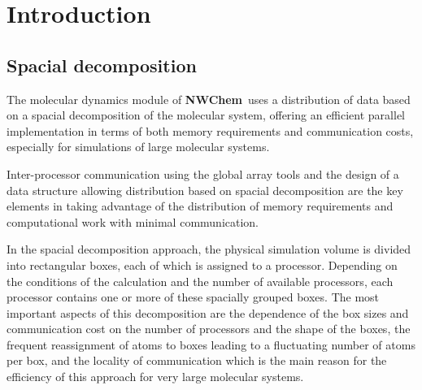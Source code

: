 \label{sec:nwARGOS}
\newcommand{\mc}[3]{\mbox{\bf #3}}
\newcommand{\vb}[1]{\mbox{\verb.#1.}}
\newcommand{\none}{\multicolumn{2}{|c|}{ }}
\newcommand{\mcc}[1]{\multicolumn{2}{c}{#1}}
\def\bmu{\mbox{\boldmath $\mu$}}
\def\bE{\mbox{\bf E}}
\def\br{\mbox{\bf r}}
\def\tT{\tilde{T}}
\def\t{\tilde{1}}
\def\ip{i\prime}
\def\jp{j\prime}
\def\ipp{i\prime\prime}
\def\jpp{j\prime\prime}
\def\etal{{\sl et al.}}
\def\nwchem{{\bf NWChem}}
\def\nwargos{{\bf nwargos}}
\def\prepare{{\bf prepare}}
\def\nwtop{{\bf nwtop}}
\def\nwrst{{\bf nwrst}}
\def\nwsgm{{\bf nwsgm}}
\def\argos{{\bf ARGOS}}

\section{Introduction}

\subsection{Spacial decomposition}
The molecular dynamics module of \nwchem\ uses a distribution of data
based on a spacial decomposition of the molecular system, offering
an efficient parallel implementation in terms of both memory 
requirements and communication costs, especially for simulations of 
large molecular systems.

Inter-processor communication using the global array tools and the
design of a data structure allowing distribution based on spacial
decomposition are the key elements in taking advantage of
the distribution of memory requirements and computational work with
minimal communication.

In the spacial decomposition approach, the physical simulation
volume is divided into rectangular boxes, each of which is
assigned to a processor. Depending on the conditions of the 
calculation and the number of available processors, each processor 
contains one or more of these spacially grouped boxes.
The most important aspects of this decomposition are the dependence 
of the box sizes and communication cost on the number of processors 
and the shape of the boxes, the frequent reassignment of atoms to 
boxes leading to a fluctuating number of atoms per box, and the 
locality of communication which is the main reason for the efficiency 
of this approach for very large molecular systems.

